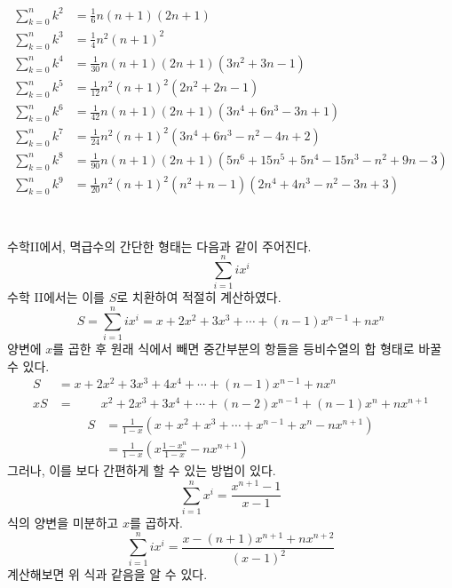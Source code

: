 \documentclass[a0,portrait]{a0poster}
\begin{document}
\begin{multicols}{2}
\begin{align*}
\sum_{k=0}^n k^2&=\frac 1 6 n(n+1)(2n+1)\\
\sum_{k=0}^n k^3&=\frac 1 4 n^2 (n+1)^2 \\
\sum_{k=0}^n k^4&=\frac 1 {30} n (n+1)(2n+1)(3n^2+3n-1)\\
\sum_{k=0}^n k^5&=\frac 1 {12} n^2 (n+1)^2 (2n^2 + 2n-1) \\
\sum_{k=0}^n k^6&=\frac 1 {42} n(n+1)(2n+1)(3n^4 + 6n^3 - 3n + 1)\\
\sum_{k=0}^n k^7&=\frac 1 {24} n^2 (n+1)^2 (3n^4 + 6n^3 - n^2 - 4n + 2)\\
\sum_{k=0}^n k^8&=\frac 1 {90} n(n+1)(2n+1)(5n^6 + 15n^5 + 5n^4 - 15n^3 - n^2 + 9n - 3)\\
\sum_{k=0}^n k^9&=\frac 1 {20} n^2(n+1)^2 (n^2+n-1)(2n^4 + 4n^3 - n^2 - 3n + 3)\\
\end{align*}





\section*{}

수학II에서, 멱급수의 간단한 형태는 다음과 같이 주어진다.
\[\sum_{i=1}^{n}ix^i\] 
수학 II에서는 이를 $S$로 치환하여 적절히 계산하였다.
\[S=\sum_{i=1}^{n}ix^i=x+2x^2+3x^3 + \cdots +(n-1)x^{n-1}+nx^n\]
양변에 $x$를 곱한 후 원래 식에서 빼면 중간부분의 항들을 등비수열의 합 형태로 바꿀 수 있다.
\begin{align*}
S&=x+2x^2+3x^3+4x^4+\cdots +(n-1)x^{n-1}+nx^n \\
xS&=\,\qquad x^2+2x^3+3x^4+\cdots +(n-2)x^{n-1}+(n-1)x^{n}+nx^{n+1} 
\end{align*}
\begin{align*}
S&=\frac{1}{1-x}\left(x+x^2+x^3+\cdots+x^{n-1}+x^n-nx^{n+1} \right) \\
&=\frac{1}{1-x}\left(x\frac{1-x^{n}}{1-x}-nx^{n+1} \right)
\end{align*}
그러나, 이를 보다 간편하게 할 수 있는 방법이 있다.
\[\sum_{i=1}^{n}x^i=\frac{x^{n+1}-1}{x-1}\]
식의 양변을 미분하고 $x$를 곱하자.
\[\sum_{i=1}^{n}ix^i=\frac{x-(n+1)x^{n+1}+nx^{n+2}}{(x-1)^2}\]
계산해보면 위 식과 같음을 알 수 있다. \\


\end{multicols}
\end{document}
